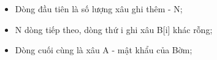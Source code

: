 \begin{itemize}
	\item     Dòng đầu tiên là số lượng xâu ghi thêm - N;   
	\item     N dòng tiếp theo, dòng thứ i ghi xâu B[i] khác rỗng;   
	\item     Dòng cuối cùng là xâu A - mật khẩu của Bờm;   
\end{itemize}